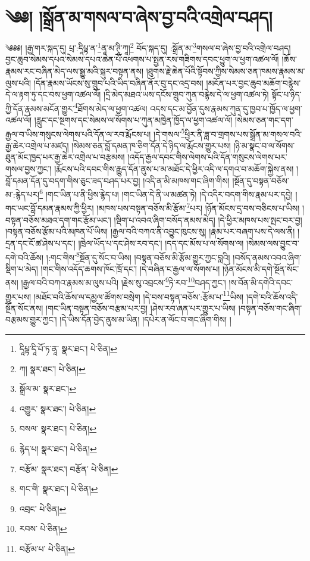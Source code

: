 \setcounter{footnote}{0} 
\chapter{༄༅། །སྒྲོན་མ་གསལ་བ་ཞེས་བྱ་བའི་འགྲེལ་བཤད།}༄༅༅། །རྒྱ་གར་སྐད་དུ། པྲ་:དཱིཔྟ་ན་\footnote{དཱིཔྟ་དཱི་པོ་ཏ་ནཱ་  སྣར་ཐང་།  པེ་ཅིན། }ནཱ་མ་ཊཱི་ཀཱ།\footnote{ཀ།  སྣར་ཐང་།  པེ་ཅིན། } བོད་སྐད་དུ། :སྒྲོན་མ་\footnote{སྒྲོལ་མ་  སྣར་ཐང་། }གསལ་བ་ཞེས་བྱ་བའི་འགྲེལ་བཤད། བྱང་ཆུབ་སེམས་དཔའ་སེམས་དཔའ་ཆེན་པོ་འཕགས་པ་སྤྱན་རས་གཟིགས་དབང་ཕྱུག་ལ་ཕྱག་འཚལ་ལོ། །ཆོས་རྣམས་རང་བཞིན་མེད་ལས་སྒྱུ་མའི་སྐུར་བསྟན་ནས། །ཐུགས་རྗེ་ཆེན་པོའི་སྟོབས་ཀྱིས་སེམས་ཅན་ཁམས་རྣམས་མ་ལུས་པའི། །དོན་རྣམས་ཡོངས་སུ་གྲུབ་པའི་ཡིད་བཞིན་ནོར་བུ་དང་འདྲ་བས། །མངོན་པར་བྱང་ཆུབ་མཆོག་བརྙེས་དེ་ལ་རྟག་ཏུ་དང་བས་ཕྱག་འཚལ་ལོ། །དྲི་མེད་མཐའ་ཡས་དངོས་གྲུབ་ཀུན་བརྙེས་དེ་ལ་ཕྱག་འཚལ་ཏེ། སྟོང་པ་ཉིད་ཀྱི་དོན་རྣམས་མངོན་གྱུར་\footnote{འགྱུར་  སྣར་ཐང་།  པེ་ཅིན། }ཐོགས་མེད་ལ་ཕྱག་འཚལ། འདས་དང་མ་བྱོན་དུས་རྣམས་ཀུན་དུ་ཁྱབ་པ་ཁྱོད་ལ་ཕྱག་འཚལ་ལོ། །རླུང་དང་སྔགས་དང་སེམས་ལ་སོགས་པ་ཀུན་མཁྱེན་ཁྱོད་ལ་ཕྱག་འཚལ་ལོ། །སེམས་ཅན་གང་དག་རྒྱལ་བ་ཡིས་གསུངས་ལེགས་པའི་དོན་ལ་རབ་རྨོངས་པ། །དེ་གསལ་\footnote{བསལ་  སྣར་ཐང་།  པེ་ཅིན། }ཕྱིར་ནི་ཟླ་བ་གྲགས་པས་སྒྲོན་མ་གསལ་བའི་རྒྱ་ཆེར་འགྲེལ་པ་མཛད། །སེམས་ཅན་བློ་དམན་ཁ་ཅིག་དོན་དེ་ཉིད་ལ་རྨོངས་གྱུར་པས། །ཉི་མ་སྣང་བ་ལ་སོགས་ཐུན་མོང་ཁྱད་པར་རྒྱ་ཆེར་འགྲེལ་པ་བརྩམས། །འདོད་རྒྱལ་དབང་གིས་ལེགས་པའི་དོན་གསུངས་ལེགས་པར་གསལ་བྱས་ཀྱང་། །རྨོངས་པའི་དབང་གིས་རྒྱུད་དོན་ནུས་པ་མ་མཐོང་དེ་ཕྱིར་འདི་ལ་དགའ་བ་མཆོག་སྐྱེས་ནས། །བློ་དམན་དོན་དུ་བདག་གིས་ཅུང་ཟད་བཤད་པར་བྱ། །འདི་ན་མི་མཁས་གང་ཞིག་གིས། །སྔོན་དུ་བསྟན་བཅོས་མ་:རྙེད་པར།\footnote{རྙེད་པ།  སྣར་ཐང་།  པེ་ཅིན། } །གང་ཡིན་པ་ནི་ཕྱིས་རྙེད་པ། །གང་ཡིན་དེ་ནི་ཡ་མཚན་ཏེ། །དེ་འདིར་བདག་གིས་རྣམ་པར་དབྱེ། །གང་ཡང་བློ་དམན་རྣམས་ཀྱི་ཕྱིར། །མཁས་པས་བསྟན་བཅོས་མི་རྩོམ་\footnote{བརྩོམ་  སྣར་ཐང་། བརྩོན་  པེ་ཅིན། }པར། །ཉོན་མོངས་དྲ་བས་བཅིངས་པ་ཡིས། །བསྟན་བཅོས་མཐའ་དག་གང་རྩོམ་ཡང་། །སྡིག་པ་འབའ་ཞིག་བསོད་ནམས་མེད། །དེ་ཕྱིར་མཁས་པས་སྤང་བར་བྱ། །བསྟན་བཅོས་རྩོམ་པའི་མཁན་པོ་ཡིས། །རྒྱལ་བའི་བཀའ་ནི་འབྱུང་ཁུངས་སུ། །རྣམ་པར་བཞག་པས་དེ་ལས་ནི། །དྲན་དང་ངོ་ཚ་ཤེས་པ་དང་། །ཁྲེལ་ཡོད་པ་དང་ཤེས་རབ་དང་། །དད་དང་མོས་པ་ལ་སོགས་ལ། །སེམས་ལས་བྱུང་བ་དགེ་བའི་ཆོས། །:གང་གིས་\footnote{གང་གི་  སྣར་ཐང་།  པེ་ཅིན། }སྔོན་དུ་སོང་བ་ཡིས། །བསྟན་བཅོས་མི་རྩོམ་གྱུར་ཀྱང་བླའི། །བསོད་ནམས་འབའ་ཞིག་སྡིག་པ་མེད། །གང་གིས་འདོད་ཆགས་ཁོང་ཁྲོ་དང་། །དེ་བཞིན་ང་རྒྱལ་ལ་སོགས་པ། །ཉོན་མོངས་མི་དགེ་སྔོན་སོང་ནས། །རྒྱལ་བའི་བཀའ་རྣམས་མ་ལུས་པའི། །རྗེས་སུ་འབྲངས་\footnote{འབྲང་  པེ་ཅིན། }ཏེ་རབ་\footnote{རབས་  པེ་ཅིན། }བཤད་ཀྱང་། །ས་བོན་མི་དགེའི་དབང་གྱུར་པས། །མཐོང་བའི་ཆོས་ལ་དམྱལ་ཚོགས་བསྲེག །དེ་བས་བསྟན་བཅོས་:རྩོམ་པ་\footnote{བརྩོམ་པ་  པེ་ཅིན། }ཡིས། །དགེ་བའི་ཆོས་འདི་སྔོན་སོང་ནས། །གང་ཡིན་བསྟན་བཅོས་བརྩམ་པར་བྱ། །ཤེས་རབ་ཞན་པར་གྱུར་པ་ཡིས། །བསྟན་བཅོས་གང་ཞིག་བརྩམས་གྱུར་ཀྱང་། །དེ་ཡིས་དོན་བྱེད་ནུས་མ་ཡིན། །དཔེར་ན་ལོང་བ་གང་ཞིག་གིས། །

